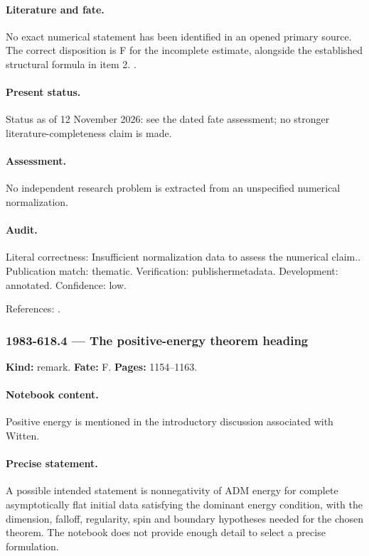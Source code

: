 \paragraph{Literature and fate.} No exact numerical statement has been identified in an opened primary source. The correct disposition is F for the incomplete estimate, alongside the established structural formula in item 2. \citep{witten1981kaluza}.

\paragraph{Present status.} Status as of 12 November 2026: see the dated fate assessment; no stronger literature-completeness claim is made.

\paragraph{Assessment.} No independent research problem is extracted from an unspecified numerical normalization.

\paragraph{Audit.} Literal correctness: Insufficient normalization data to assess the numerical claim.. Publication match: thematic. Verification: publishermetadata. Development: annotated. Confidence: low.

\noindent References: \citep{witten1981kaluza}.\par

\subsubsection{1983-618.4 --- The positive-energy theorem heading}

\label{item:1983-618.4}

\noindent\textbf{Kind:} remark. \textbf{Fate:} F. \textbf{Pages:} 1154--1163.\par

\paragraph{Notebook content.} Positive energy is mentioned in the introductory discussion associated with Witten.

\paragraph{Precise statement.} A possible intended statement is nonnegativity of ADM energy for complete asymptotically flat initial data satisfying the dominant energy condition, with the dimension, falloff, regularity, spin and boundary hypotheses needed for the chosen theorem. The notebook does not provide enough detail to select a precise formulation.

